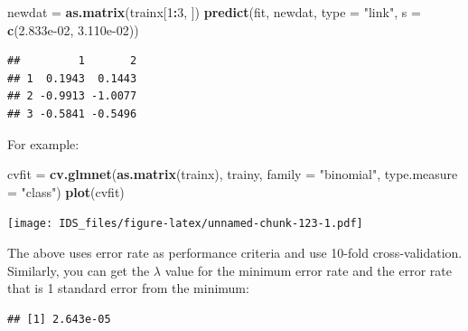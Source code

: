 \documentclass[12pt,]{krantz}
\makeatletter
\newenvironment{Shaded}{\begin{snugshade}}{\end{snugshade}}
\newcommand{\DataTypeTok}[1]{\textcolor[rgb]{0.27,0.27,0.27}{#1}}
\newcommand{\DecValTok}[1]{\textcolor[rgb]{0.06,0.06,0.06}{#1}}
\newcommand{\FloatTok}[1]{\textcolor[rgb]{0.06,0.06,0.06}{#1}}
\newcommand{\KeywordTok}[1]{\textcolor[rgb]{0.27,0.27,0.27}{\textbf{#1}}}
\newcommand{\NormalTok}[1]{#1}
\newcommand{\OperatorTok}[1]{\textcolor[rgb]{0.43,0.43,0.43}{\textbf{#1}}}
\newcommand{\StringTok}[1]{\textcolor[rgb]{0.5,0.5,0.5}{#1}}
\newenvironment{kframe}{%
\medskip{}
\setlength{\fboxsep}{.8em}
 \def\at@end@of@kframe{}%
 \ifinner\ifhmode%
  \def\at@end@of@kframe{\end{minipage}}%
  \begin{minipage}{\columnwidth}%
 \fi\fi%
 \def\FrameCommand##1{\hskip\@totalleftmargin \hskip-\fboxsep
 \colorbox{shadecolor}{##1}\hskip-\fboxsep
     \hskip-\linewidth \hskip-\@totalleftmargin \hskip\columnwidth}%
 \MakeFramed {\advance\hsize-\width
   \@totalleftmargin\z@ \linewidth\hsize
   \@setminipage}}%
 {\par\unskip\endMakeFramed%
 \at@end@of@kframe}
\renewenvironment{Shaded}{\begin{kframe}}{\end{kframe}}
\makeatother
\begin{document}
\begin{Shaded}
\begin{Highlighting}[]
\NormalTok{newdat =}\StringTok{ }\KeywordTok{as.matrix}\NormalTok{(trainx[}\DecValTok{1}\OperatorTok{:}\DecValTok{3}\NormalTok{, ])}
\KeywordTok{predict}\NormalTok{(fit, newdat, }\DataTypeTok{type =} \StringTok{"link"}\NormalTok{, }\DataTypeTok{s =} \KeywordTok{c}\NormalTok{(}\FloatTok{2.833e-02}\NormalTok{, }\FloatTok{3.110e-02}\NormalTok{))}
\end{Highlighting}
\end{Shaded}

\begin{verbatim}
##         1       2
## 1  0.1943  0.1443
## 2 -0.9913 -1.0077
## 3 -0.5841 -0.5496
\end{verbatim}

For example:

\begin{Shaded}
\begin{Highlighting}[]
\NormalTok{cvfit =}\StringTok{ }\KeywordTok{cv.glmnet}\NormalTok{(}\KeywordTok{as.matrix}\NormalTok{(trainx), trainy, }
                  \DataTypeTok{family =} \StringTok{"binomial"}\NormalTok{, }\DataTypeTok{type.measure =} \StringTok{"class"}\NormalTok{)}
\KeywordTok{plot}\NormalTok{(cvfit)}
\end{Highlighting}
\end{Shaded}

\texttt{[image: IDS\_files/figure-latex/unnamed-chunk-123-1.pdf]}

The above uses error rate as performance criteria and use 10-fold cross-validation. Similarly, you can get the \(\lambda\) value for the minimum error rate and the error rate that is 1 standard error from the minimum:

\begin{Shaded}
\end{Shaded}

\begin{verbatim}
## [1] 2.643e-05
\end{verbatim}

\begin{Shaded}
\end{Shaded}
\end{document}
